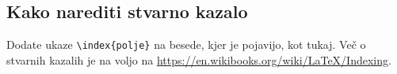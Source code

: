 \documentclass[12pt,a4paper,twoside]{article}
\newcommand{\literatura}{literatura}  %
\theoremstyle{definition} %
\theoremstyle{plain} %
\numberwithin{equation}{section}  %
\begin{document}


\subsection{Kako narediti stvarno kazalo}
Dodate ukaze \verb|\index{polje}| na besede, kjer je pojavijo, kot tukaj.
Več o stvarnih kazalih je na voljo na \url{https://en.wikibooks.org/wiki/LaTeX/Indexing}.


\cleardoublepage                           %

\cleardoublepage                           %
\printindex
\end{document}
